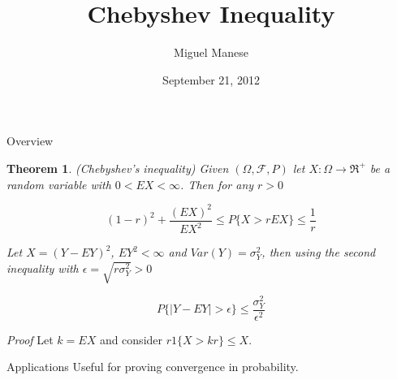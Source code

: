 \documentclass{article}
\title{Chebyshev Inequality}
\author{Miguel Manese}
\date{September 21, 2012}
\newtheorem{thm}{Theorem}
\begin{document}
\maketitle

\begin{section}{Overview}
\begin{thm} (Chebyshev's inequality) Given $(\Omega, \mathcal{F}, P)$ let
$X : \Omega \to \Re^+$ be a random variable with $0 < EX < \infty$. Then
for any $r > 0$

\[ (1 - r)^2 + \frac{(E X)^2}{E X^2} \leq P\{X > r E X\} \leq \frac{1}{r} \]

\noindent Let $X = (Y - E Y)^2$, $E Y^2 < \infty$ and $Var(Y) = \sigma_Y^2$, 
then using the second inequality with $\epsilon = \sqrt{r \sigma_Y^2} > 0$ 


\[ P\{ |Y - EY| > \epsilon \} \leq \frac{\sigma_Y^2}{\epsilon^2} \]
\end{thm}

\noindent \emph{Proof} Let $k = E X$ and consider $r 1\{X > k r\} \leq X$.
\end{section}

\begin{section}{Applications}
Useful for proving convergence in probability.
\end{section}
\end{document}
